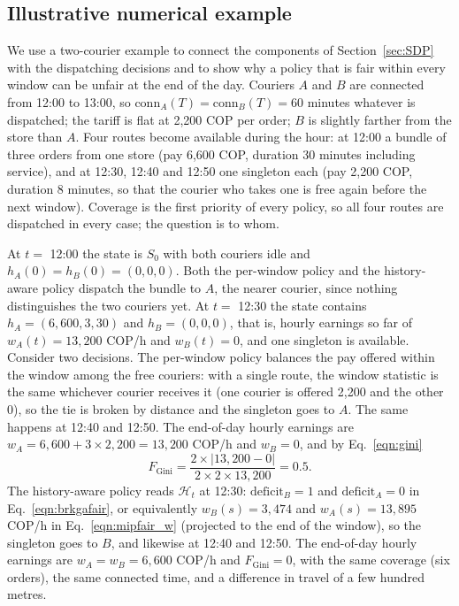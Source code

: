 \documentclass[a4paper,11pt,review,3p,authoryear]{elsarticle}
\newcommand{\Hist}{\mathcal{H}}
\newcommand{\FG}{F_{\text{Gini}}}
\newcommand{\conn}{\mathrm{conn}}
\begin{document}
\subsection{Illustrative numerical example}
\label{sec:example}

We use a two-courier example to connect the components of Section~\ref{sec:SDP} with the dispatching decisions and to show why a policy that is fair within every window can be unfair at the end of the day. Couriers $A$ and $B$ are connected from 12:00 to 13:00, so $\conn_A(T) = \conn_B(T) = 60$ minutes whatever is dispatched; the tariff is flat at 2{,}200 COP per order; $B$ is slightly farther from the store than $A$. Four routes become available during the hour: at 12:00 a bundle of three orders from one store (pay 6{,}600 COP, duration 30 minutes including service), and at 12:30, 12:40 and 12:50 one singleton each (pay 2{,}200 COP, duration 8 minutes, so that the courier who takes one is free again before the next window). Coverage is the first priority of every policy, so all four routes are dispatched in every case; the question is to whom.

At $t = $ 12:00 the state is $S_0$ with both couriers idle and $h_A(0) = h_B(0) = (0, 0, 0)$. Both the per-window policy and the history-aware policy dispatch the bundle to $A$, the nearer courier, since nothing distinguishes the two couriers yet. At $t = $ 12:30 the state contains $h_A = (6{,}600, 3, 30)$ and $h_B = (0, 0, 0)$, that is, hourly earnings so far of $w_A(t) = 13{,}200$ COP/h and $w_B(t) = 0$, and one singleton is available. Consider two decisions. The per-window policy balances the pay offered within the window among the free couriers: with a single route, the window statistic is the same whichever courier receives it (one courier is offered 2{,}200 and the other 0), so the tie is broken by distance and the singleton goes to $A$. The same happens at 12:40 and 12:50. The end-of-day hourly earnings are $w_A = 6{,}600 + 3 \times 2{,}200 = 13{,}200$ COP/h and $w_B = 0$, and by Eq.~\eqref{eqn:gini}
\begin{equation*}
\FG = \frac{2 \times |13{,}200 - 0|}{2 \times 2 \times 13{,}200} = 0.5.
\end{equation*}
The history-aware policy reads $\Hist_t$ at 12:30: $\text{deficit}_B = 1$ and $\text{deficit}_A = 0$ in Eq.~\eqref{eqn:brkgafair}, or equivalently $w_B(s) = 3{,}474$ and $w_A(s) = 13{,}895$ COP/h in Eq.~\eqref{eqn:mipfair_w} (projected to the end of the window), so the singleton goes to $B$, and likewise at 12:40 and 12:50. The end-of-day hourly earnings are $w_A = w_B = 6{,}600$ COP/h and $\FG = 0$, with the same coverage (six orders), the same connected time, and a difference in travel of a few hundred metres.
\end{document}
